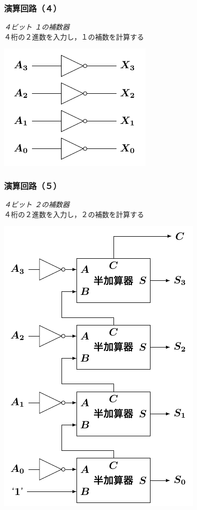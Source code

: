 \documentclass[handout]{beamer}        %
\begin{document}
\begin{frame}
  \frametitle{演算回路（４）}
  \emph{４ビット １の補数器} \\
  ４桁の２進数を入力し，１の補数を計算する
  \vfill
  \centerline{\includegraphics[scale=1.0]{../Tikz/onesc.pdf}}
  \vfill
\end{frame}

\begin{frame}
  \frametitle{演算回路（５）}
  \emph{４ビット ２の補数器} \\
  ４桁の２進数を入力し，２の補数を計算する
  \vfill
  \centerline{\includegraphics[scale=0.7]{../Tikz/twosc.pdf}}
  \vfill
\end{frame}
\end{document}
